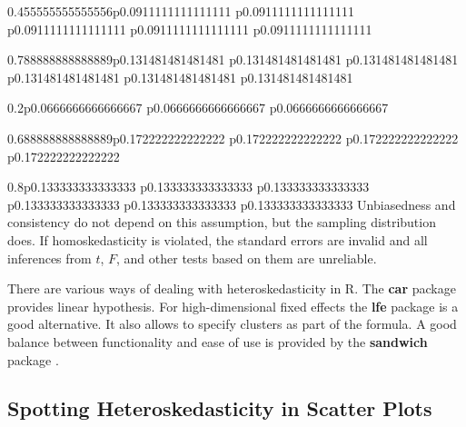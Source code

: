 \documentclass[]{book}
\newenvironment{Shaded}{\begin{snugshade}}{\end{snugshade}}
\newcommand{\DataTypeTok}[1]{\textcolor[rgb]{0.13,0.29,0.53}{#1}}
\newcommand{\KeywordTok}[1]{\textcolor[rgb]{0.13,0.29,0.53}{\textbf{#1}}}
\newcommand{\NormalTok}[1]{#1}
\newcommand{\OperatorTok}[1]{\textcolor[rgb]{0.81,0.36,0.00}{\textbf{#1}}}
\newcommand{\StringTok}[1]{\textcolor[rgb]{0.31,0.60,0.02}{#1}}
\begin{document}
\begin{tabularx}{0.455555555555556\textwidth}{p{} p{} p{} p{} p{}}
\begin{tabularx}{0.788888888888889\textwidth}{p{} p{} p{} p{} p{} p{}}
\begin{tabularx}{0.2\textwidth}{p{} p{} p{}}
\begin{tabularx}{0.688888888888889\textwidth}{p{} p{} p{} p{}}
\begin{tabularx}{0.8\textwidth}{p{} p{} p{} p{} p{} p{}}
Unbiasedness and consistency do not depend on this assumption, but the
sampling distribution does. If homoskedasticity is violated, the
standard errors are invalid and all inferences from \(t\), \(F\), and
other tests based on them are unreliable.

There are various ways of dealing with heteroskedasticity in R. The
\textbf{car} package provides linear hypothesis. For high-dimensional
fixed effects the \textbf{lfe} package is a good alternative. It also
allows to specify clusters as part of the formula. A good balance
between functionality and ease of use is provided by the
\textbf{sandwich} package \citet{Zeileis2017}.

\hypertarget{spotting-heteroskedasticity-in-scatter-plots}{%
\subsection{Spotting Heteroskedasticity in Scatter
Plots}\label{spotting-heteroskedasticity-in-scatter-plots}}

\begin{Shaded}
\end{Shaded}

\begin{figure}


\end{figure}
\end{tabularx}
\end{tabularx}
\end{tabularx}
\end{tabularx}
\end{tabularx}
\end{document}

